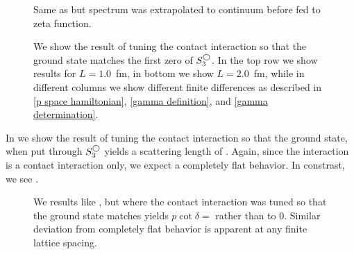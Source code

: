 \begin{figure}[th]
    \scalebox{0.9}{}
    \caption{Same as  but spectrum was extrapolated to continuum before fed to zeta function.}
    \label{fig:unimproved spherical continuum extrapolation}
\end{figure}


\begin{figure}[th]
    \scalebox{0.9}{}
    \caption{We show the result of tuning the contact interaction so that the ground state matches the first zero of $S^{\bigcirc}_3$.  In the top row we show results for $L=1.0$~fm, in bottom we show $L=2.0$~fm, while in different columns we show different finite differences as described in \eqref{p space hamiltonian}, \eqref{gamma definition}, and \eqref{gamma determination}. }
    \label{fig:unimproved spherical}
\end{figure}




In  we show the result of tuning the contact interaction so that the ground state, when put through $S^{\bigcirc}_3$ yields a scattering length of .
Again, since the interaction is a contact interaction only, we expect a completely flat behavior.
In constrast, we see .

\begin{figure}[th]
    \scalebox{0.9}{}
    \caption{We results like , but where the contact interaction was tuned so that the ground state matches yields $p\cot\delta = $ rather than to 0.  Similar deviation from completely flat behavior is apparent at any finite lattice spacing.}
    \label{fig:finite a spherical}
\end{figure}

\clearpage
